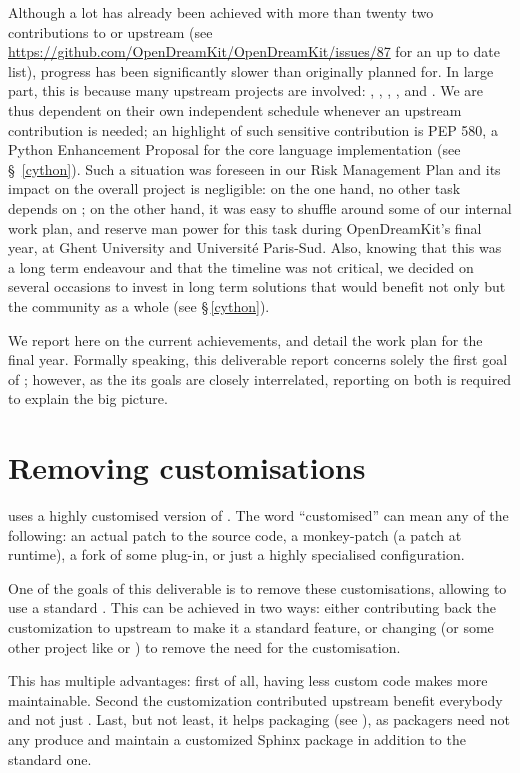 \documentclass{deliverablereport}
\begin{document}
Although a lot has already been achieved with more than twenty two
contributions to \Sage or upstream (see
\url{https://github.com/OpenDreamKit/OpenDreamKit/issues/87} for an up
to date list), progress has been
significantly slower than originally planned for. In large part, this
is because many upstream projects are involved: \Sphinx, \Docutils,
\Pygments, \Cython, and \Python. We are thus dependent on their own
independent schedule whenever an upstream contribution is needed;
an highlight of such sensitive contribution is PEP 580, a Python
Enhancement Proposal for the core language implementation (see \S~\ref{cython}). Such
a situation was foreseen in our Risk Management Plan and its impact on
the overall project is negligible: on the one hand, no other task
depends on ; on the other hand, it was easy to
shuffle around some of our internal work plan, and reserve man power
for this task during OpenDreamKit's final year, at Ghent University
and Université Paris-Sud. Also, knowing that this was a long term
endeavour and that the timeline was not critical, we decided on
several occasions to invest in long term solutions that would benefit
not only \Sage but the community as a whole (see \S\,\ref{cython}).

We report here on the current achievements, and detail the work plan for the
final year. Formally speaking, this deliverable report concerns solely the
first goal of ; however, as the its goals are closely interrelated, reporting on
both is required to explain the big picture.

\section{Removing \Sage customisations}

\Sage uses a highly customised version of \Sphinx.
The word ``customised'' can mean any of the following:
an actual patch to the source code,
a monkey-patch (a patch at runtime),
a fork of some plug-in, or just a highly specialised configuration.

One of the goals of this deliverable is to remove these
customisations, allowing \Sage to use a standard \Sphinx.
This can be achieved in two ways:
either contributing back the customization to upstream \Sphinx to make
it a standard feature,
or changing \Sage (or some other project like \Cython or \Python)
to remove the need for the customisation.

This has multiple advantages:
first of all, having less custom code makes \Sage more maintainable.
Second the customization contributed upstream benefit everybody
and not just \Sage. Last, but not least, it helps packaging \Sage
(see ),
as packagers need not any produce and maintain a customized Sphinx
package in addition to the standard one.
\end{document}
